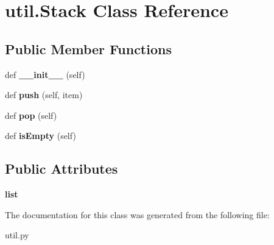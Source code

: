 \hypertarget{classutil_1_1_stack}{}\section{util.\+Stack Class Reference}
\label{classutil_1_1_stack}
\subsection*{Public Member Functions}
\begin{DoxyCompactItemize}
\item 
\mbox{\label{classutil_1_1_stack_a33ce3c769ea27fa11e4c924b79f221cf}} 
def {\bfseries \+\_\+\+\_\+init\+\_\+\+\_\+} (self)
\item 
\mbox{\label{classutil_1_1_stack_a6f20aecd317c195f98e86b61c1756f3d}} 
def {\bfseries push} (self, item)
\item 
\mbox{\label{classutil_1_1_stack_a3e09e2fd824f1a710fb1bfa76dc58abe}} 
def {\bfseries pop} (self)
\item 
\mbox{\label{classutil_1_1_stack_a1ea38d74b69c02ce0946e9104824beea}} 
def {\bfseries is\+Empty} (self)
\end{DoxyCompactItemize}
\subsection*{Public Attributes}
\begin{DoxyCompactItemize}
\item 
\mbox{\label{classutil_1_1_stack_ae8fb89dd9d2961cc72c6cbfc3135ad1a}} 
{\bfseries list}
\end{DoxyCompactItemize}


The documentation for this class was generated from the following file\+:\begin{DoxyCompactItemize}
\item 
util.\+py\end{DoxyCompactItemize}
